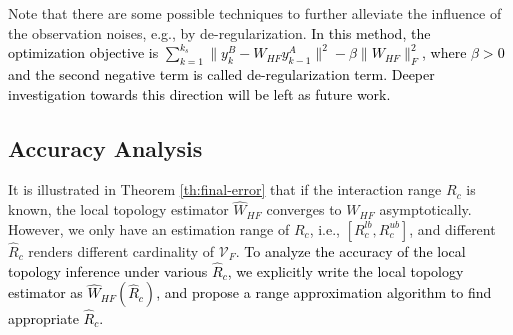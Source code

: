 \documentclass[12pt,journal,draftclsnofoot,onecolumn]{IEEEtran}
\newtheorem{remark}{Remark}
\let \sss=\scriptscriptstyle
\begin{document}
Note that there are some possible techniques to further alleviate the influence of the observation noises, e.g., by de-regularization. 
\textcolor{black}{In this method, the optimization objective is $\sum\nolimits_{k = 1}^{k_s} \| y_k^{\sss B}- {W_{\sss HF}} y_{k-1}^{\sss A} \|^2-\beta\|W_{\sss HF}\|_{F}^2$, where $\beta>0$ and the second negative term is called de-regularization term. 
Deeper investigation towards this direction will be left as future work. }

\subsection{Accuracy Analysis}
It is illustrated in Theorem \ref{th:final-error} that if the interaction range $R_c$ is known, the local topology estimator $\hat W_{\sss HF}$ converges to $ W_{\sss HF}$ asymptotically. 
However, we only have an estimation range of $R_c$, i.e., $[R_c^{lb},R_c^{ub}]$, and different $\hat R_c$ renders different cardinality of $\mathcal{V}_{\sss F}$. 
\textcolor{black}{To analyze the accuracy of the local topology inference under various $\hat R_c$, we explicitly write the local topology estimator as $\hat{W}_{\sss HF}(\hat{R}_c)$, and propose a range approximation algorithm to find appropriate $\hat R_c$. }
\end{document}
